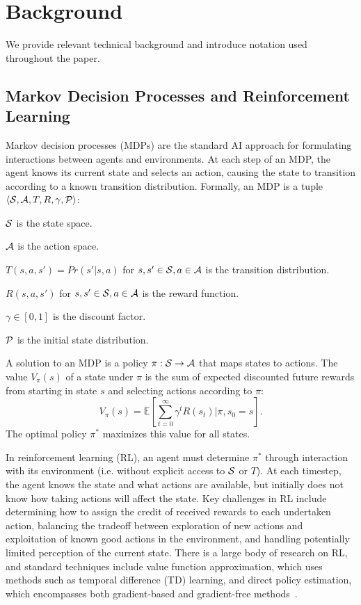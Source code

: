 \section{Background}
We provide relevant technical background and introduce notation
used throughout the paper.

\subsection{Markov Decision Processes and Reinforcement Learning}
Markov decision processes (MDPs) are the standard AI approach for formulating
interactions between agents and environments. At each step of an MDP,
the agent knows its current state and selects an action, causing the
state to transition according to a known transition distribution. Formally,
an MDP is a tuple $\langle \mathcal{S}, \mathcal{A}, T, R, \gamma, \mathcal{P} \rangle$:
\begin{tightlist}
\item $\mathcal{S}$ is the state space.
\item $\mathcal{A}$ is the action space.
\item $T(s, a, s') = Pr(s' | s, a)$ for $s, s' \in \mathcal{S}, a \in \mathcal{A}$ is the transition distribution.
\item $R(s, a, s')$ for $s, s' \in \mathcal{S}, a \in \mathcal{A}$ is the reward function.
\item $\gamma \in [0, 1]$ is the discount factor.
\item $\mathcal{P}$ is the initial state distribution.
\end{tightlist}
A solution to an MDP is a policy $\pi: \mathcal{S} \rightarrow \mathcal{A}$ that maps states to
actions. The value $V_{\pi}(s)$ of a state under $\pi$ is the sum of expected
discounted future rewards from starting in state $s$ and selecting actions according
to $\pi$:
$$V_{\pi}(s) = \mathbb{E}[\sum_{t=0}^{\infty}\gamma^{t}R(s_{t}) | \pi, s_{0} = s].$$
The optimal policy $\pi^{*}$ maximizes this value for all states.

In reinforcement learning (RL), an agent must determine $\pi^{*}$
through interaction with its environment (i.e. without explicit access
to $\mathcal{S}$ or $T$). At each timestep, the agent knows the state and what
actions are available, but initially does not know how taking actions will
affect the state. Key challenges in RL include determining how to assign
the credit of received rewards to each undertaken action, balancing the tradeoff between
exploration of new actions and exploitation of known good actions in the environment, and handling
potentially limited perception of the current state. There is a large body of research on RL, and
standard techniques include value function approximation, which uses methods such as temporal difference
(TD) learning, and direct policy estimation, which encompasses both gradient-based
and gradient-free methods~\cite{suttonbarto}.

